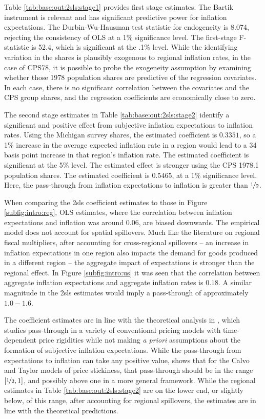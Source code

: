 \documentclass[12pt]{article}
\begin{document}
Table \ref{tab:base:out:2sls:stage1} provides first stage estimates. The Bartik instrument is relevant and has significant predictive power for inflation expectations. The Durbin-Wu-Hausman test statistic for endogeneity is 8.074, rejecting the consistency of OLS at a 1\% significance level. The first-stage F-statistic is 52.4, which is significant at the .1\% level. While the identifying variation in the shares is plausibly exogenous to regional inflation rates, in the case of CPS78, it is possible to probe the exogeneity assumption by examining whether those 1978 population shares are predictive of the regression covariates. In each case, there is no significant correlation between the covariates and the CPS group shares, and the regression coefficients are economically close to zero.

The second stage estimates in Table \ref{tab:base:out:2sls:stage2} identify a significant and positive effect from subjective inflation expectations to inflation rates. Using the Michigan survey shares, the estimated coefficient is $0.3351$, so a 1\% increase in the average expected inflation rate in a region would lead to a 34 basis point increase in that region's inflation rate. The estimated coefficient is significant at the 5\% level. The estimated effect is stronger using the CPS 1978.1 population shares. The estimated coefficient is $0.5465$, at a 1\% significance level. Here, the pass-through from inflation expectations to inflation is greater than $\nicefrac{1}{2}$.  

When comparing the 2sls coefficient estimates to those in Figure \ref{subfig:intro:reg}, OLS estimates, where the correlation between inflation expectations and inflation was around $0.06$, are biased downwards. The empirical model does not account for spatial spillovers. Much like the literature on regional fiscal multipliers, after accounting for cross-regional spillovers -- an increase in inflation expectations in one region also impacts the demand for goods produced in a different region -- the aggregate impact of expectations is stronger than the regional effect. In Figure \ref{subfig:intro:us} it was seen that the correlation between aggregate inflation expectations and aggregate inflation rates is $0.18$. A similar magnitude in the 2sls estimates would imply a pass-through of approximately $1.0-1.6$.  

The coefficient estimates are in line with the theoretical analysis in \cite{Werning:expectsWP}, which studies pass-through in a variety of conventional pricing models with time-dependent price rigidities while not making \emph{a priori} assumptions about the formation of subjective inflation expectations. While the pass-through from expectations to inflation can take any positive value, \cite{Werning:expectsWP} shows that for the Calvo and Taylor models of price stickiness, that pass-through should be in the range $\left[\nicefrac{1}{2},1\right]$, and possibly above one in a more general framework. While the regional estimates in Table \ref{tab:base:out:2sls:stage2} are on the lower end, or slightly below, of this range, after accounting for regional spillovers, the estimates are in line with the theoretical predictions.
\end{document}
